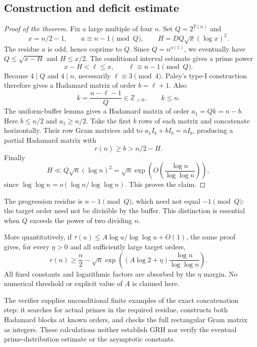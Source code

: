 \subsection{Construction and deficit estimate}
\begin{proof}[Proof of the theorem]
Fix a large multiple of four $n$. Set $Q=2^{T(n)}$ and
\[
 x=n/2-1,\qquad a\equiv n-1\pmod Q,\qquad
 H=DQ\sqrt x(\log x)^2.
\]
The residue $a$ is odd, hence coprime to $Q$. Since $Q=n^{o(1)}$,
we eventually have $Q\le\sqrt{x-H}$ and $H\le x/2$.
The conditional interval estimate gives a prime power
\[
 x-H<\ell\le x,\qquad \ell\equiv n-1\pmod Q.
\]
Because $4\mid Q$ and $4\mid n$, necessarily $\ell\equiv3\pmod4$.
Paley's type-I construction therefore gives a Hadamard matrix of
order $b=\ell+1$. Also
\[
 k=\frac{n-\ell-1}{Q}\in\mathbb Z_{>0},\qquad k\le n.
\]
The uniform-buffer lemma gives a Hadamard matrix of order
$a_1=Qk=n-b$. Here $b\le n/2$ and $a_1\ge n/2$.
Take the first $b$ rows of each matrix and concatenate horizontally.
Their row Gram matrices add to
$a_1I_b+bI_b=nI_b$, producing a partial Hadamard matrix with
\[
 r(n)\ge b>n/2-H.
\]
Finally
\[
 H\ll Q\sqrt n(\log n)^2
   =\sqrt n\exp\!\left(O\!\left(\frac{\log n}{\log\log n}\right)\right),
\]
since $\log\log n=o(\log n/\log\log n)$. This proves the claim.
\end{proof}

The progression residue is $n-1\pmod Q$, which need not equal
$-1\pmod Q$: the target order need not be divisible by the buffer.
This distinction is essential when $Q$ exceeds the power of two
dividing $n$.

More quantitatively, if
$\tau(u)\le A\log u/\log\log u+O(1)$, the same proof gives,
for every $\eta>0$ and all sufficiently large target orders,
\[
 r(n)\ge\frac n2-
 \sqrt n\exp\!\left((A\log2+\eta)
                 \frac{\log n}{\log\log n}\right).
\]
All fixed constants and logarithmic factors are absorbed by the
$\eta$ margin. No numerical threshold or explicit value of $A$
is claimed here.

The verifier supplies unconditional finite examples of the exact
concatenation step: it searches for actual primes in the required
residue, constructs both Hadamard blocks at known orders, and checks
the full rectangular Gram matrix as integers. These calculations
neither establish GRH nor verify the eventual prime-distribution
estimate or the asymptotic constants.
